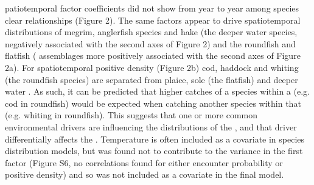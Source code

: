 \documentclass[fleqn,10pt]{wlscirep}
\begin{document}
\begin{linenumbers}
patiotemporal factor coefficients  did not show
 from year to year
  among
species  clear relationships
 (Figure
2).  The same factors appear to drive spatiotemporal  distributions of megrim, anglerfish species and hake (the
deeper water species,   negatively associated with the second axes of Figure 2) and
the roundfish and flatfish ( assemblages
more positively associated with the second axes of Figure 2a). For
spatiotemporal positive density (Figure 2b) cod, haddock and whiting (the
roundfish species) are separated from plaice, sole (the flatfish) and deeper
water . As such, it
can be predicted that higher catches of a species within a
 (e.g. cod in
roundfish) would be expected when catching another species within that
 (e.g.  whiting in
roundfish). This suggests that one or more common environmental drivers are
influencing the distributions of the , and that driver differentially affects the
.  Temperature is often
included as a covariate in species distribution models, but was found not to
contribute to the variance in the first factor
 (Figure S6, no correlations found for
either  encounter probability or positive density)
and so was not included as a covariate in the final model.\\


\end{linenumbers}
\end{document}
